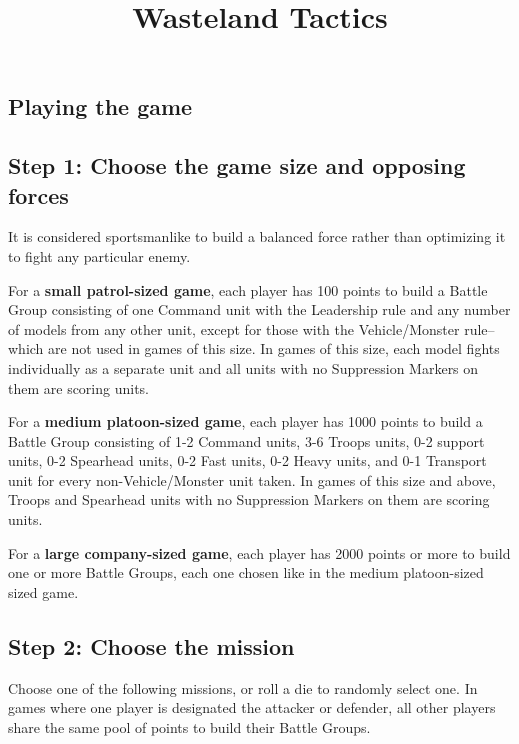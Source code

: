 








\title{Wasteland Tactics}

\begin{titlepage}
\maketitle
\end{titlepage}

\begin{multicols}{2}

\chapter*{Playing the game}

\section*{Step 1: Choose the game size and opposing forces}
It is considered sportsmanlike to build a balanced force rather than optimizing it to fight any particular enemy.

For a \textbf{small patrol-sized game}, each player has 100 points to build a Battle Group consisting of one Command unit with the Leadership rule and any number of models from any other unit, except for those with the Vehicle/Monster rule--which are not used in games of this size. In games of this size, each model fights individually as a separate unit and all units with no Suppression Markers on them are scoring units.

For a \textbf{medium platoon-sized game}, each player has 1000 points to build a Battle Group consisting of 1-2 Command units, 3-6 Troops units, 0-2 support units, 0-2 Spearhead units, 0-2 Fast units, 0-2 Heavy units, and 0-1 Transport unit for every non-Vehicle/Monster unit taken. In games of this size and above, Troops and Spearhead units with no Suppression Markers on them are scoring units.

For a \textbf{large company-sized game}, each player has 2000 points or more to build one or more Battle Groups, each one chosen like in the medium platoon-sized sized game.




\section*{Step 2: Choose the mission}
Choose one of the following missions, or roll a die to randomly select one. In games where one player is designated the attacker or defender, all other players share the same pool of points to build their Battle Groups.


\end{multicols}
